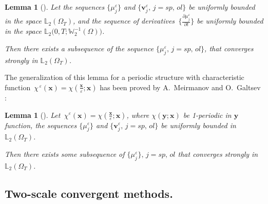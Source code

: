 \documentclass{article}
\theoremstyle{plain}
\newtheorem{lemma}[theorem]{Lemma}
\theoremstyle{definition}
\numberwithin{equation}{section}
\begin{document}
\begin{lemma}[\cite{12}]\label{l2.2}
Let the sequences $\{\mu^{\varepsilon}_{j}\}$ and $\{\boldsymbol{v}^{\varepsilon}_{j},\,j=sp,\,ol\}$
be uniformly bounded in the space $\mathbb{L}_{2}(\Omega_{T})$, and the sequence of derivatives
$\displaystyle\,\{\frac{\partial\mu^{\varepsilon}_{j}}{\partial{t}}\}$
be uniformly bounded in the space $\mathbb{L}_{2}\big(0,T;\mathbb{W}^{-1}_{2}(\Omega)\big)$.

Then there exists a subsequence of the sequence $\{\mu^{\varepsilon}_{j},\,j=sp,\,ol\}$, that converges strongly in $\mathbb{L}_{2}(\Omega_{T})$.
\end{lemma}

The generalization of this lemma for a periodic structure with characteristic function
$\displaystyle\,\chi^{\,\varepsilon}(\boldsymbol{x})=
\chi(\frac{\boldsymbol{x}}{\varepsilon};\boldsymbol{x})$
has been proved by A.~Meirmanov and O.~Galtsev \cite{16}:

\begin{lemma}[\cite{16}]\label{l2.3}
Let $\displaystyle\,\chi^{\varepsilon}(\boldsymbol{x})=
\chi(\frac{\boldsymbol{x}}{\varepsilon};\boldsymbol{x})$, where $\chi(\boldsymbol{y};\boldsymbol{x})$
be 1-periodic in $\boldsymbol{y}$ function, the sequences
$\{\mu^{\varepsilon}_{j}\}$ and $\{\boldsymbol{v}^{\varepsilon}_{j},\,j=sp,\,ol\}$ be uniformly bounded in $\mathbb{L}_{2}(\Omega_{T})$.

Then there exists some subsequence of $\{\mu^{\varepsilon}_{j}\},\,j=sp,\,ol$ that converges strongly in $\mathbb{L}_{2}(\Omega_{T})$.
\end{lemma}

\subsection{Two-scale convergent methods.}
\end{document}
